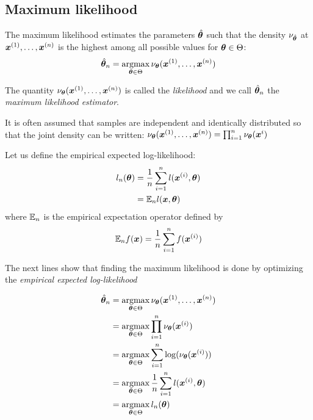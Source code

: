 \subsection{Maximum likelihood}
\label{sec:mlintro}
The maximum likelihood estimates the parameters $\hat{\boldsymbol{\theta}}$ such that the
density $\nu_{\hat{\boldsymbol{\theta}}}$ at $\boldsymbol{x}^{(1)}, \dots, \boldsymbol{x}^{(n)}$ is the highest among all possible
values for $\boldsymbol{\theta} \in \Theta$:
\begin{align}
  \hat{\boldsymbol{\theta}}_n = \operatorname*{argmax}_{\boldsymbol{\theta} \in \Theta} \nu_{\boldsymbol{\theta}}(\boldsymbol{x}^{(1)}, \dots, \boldsymbol{x}^{(n)})
\end{align}

The quantity $\nu_{\boldsymbol{\theta}}(\boldsymbol{x}^{(1)}, \dots, \boldsymbol{x}^{(n)})$ is called the
\emph{likelihood} and we call $\hat{\boldsymbol{\theta}}_n$ the \emph{maximum likelihood estimator}.

It is often assumed that samples are independent and identically distributed so that
the joint density can be written:
$\nu_{\boldsymbol{\theta}}(\boldsymbol{x}^{(1)}, \dots, \boldsymbol{x}^{(n)}) = \prod_{i=1}^n \nu_{\boldsymbol{\theta}}(\boldsymbol{x}^i)$

Let us define the empirical expected log-likelihood:
\begin{align}
  l_n(\boldsymbol{\theta}) &= \frac1n
  \sum_{i=1}^n l(\boldsymbol{x}^{(i)}, \boldsymbol{\theta}) \\
               &= \mathbb{E}_n l(\boldsymbol{x}, \boldsymbol{\theta})
\end{align}
where $\mathbb{E}_n$ is the empirical expectation operator defined by
\begin{align}
\mathbb{E}_n f(\boldsymbol{x}) = \frac1{n} \sum_{i=1}^n f(\boldsymbol{x}^{(i)})
\end{align}


The next lines show that finding the maximum likelihood is done by optimizing
the \emph{empirical expected log-likelihood}


\begin{align}
  \hat{\boldsymbol{\theta}}_n &= \operatorname*{argmax}_{\boldsymbol{\theta} \in \Theta} \nu_{\boldsymbol{\theta}}(\boldsymbol{x}^{(1)}, \dots, \boldsymbol{x}^{(n)}) \\
               &= \operatorname*{argmax}_{\boldsymbol{\theta} \in \Theta} \prod_{i=1}^n \nu_{\boldsymbol{\theta}}(\boldsymbol{x}^{(i)}) \\ 
               &= \operatorname*{argmax}_{\boldsymbol{\theta} \in \Theta} \sum_{i=1}^n \log(\nu_{\boldsymbol{\theta}}(\boldsymbol{x}^{(i)}))  \\
               &= \operatorname*{argmax}_{\boldsymbol{\theta} \in \Theta} \frac1n \sum_{i=1}^n l(\boldsymbol{x}^{(i)}, \boldsymbol{\theta}) \\ 
                  &= \operatorname*{argmax}_{\boldsymbol{\theta} \in \Theta} l_n(\boldsymbol{\theta}) \\ 
\end{align}

